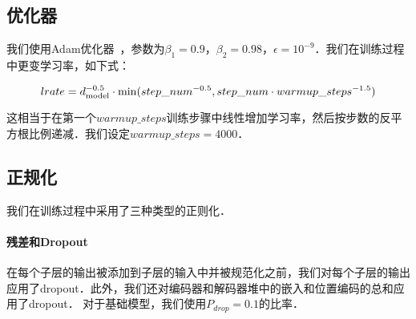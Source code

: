 \subsection{优化器} 


我们使用Adam优化器~\citep{kingma2014adam}，参数为$\beta_1=0.9$，$\beta_2=0.98$，$\epsilon=10^{-9}$．我们在训练过程中更变学习率，如下式：

\begin{equation}
lrate = d_{\text{model}}^{-0.5} \cdot
  \min({step\_num}^{-0.5},
    {step\_num} \cdot {warmup\_steps}^{-1.5})
\end{equation}


这相当于在第一个$warmup\_steps$训练步骤中线性增加学习率，然后按步数的反平方根比例递减．我们设定$warmup\_steps=4000$．

\subsection{正规化} \label{sec:reg}

我们在训练过程中采用了三种类型的正则化．
\paragraph{残差和Dropout} 在每个子层的输出被添加到子层的输入中并被规范化之前，我们对每个子层的输出应用了dropout\citep{srivastava2014dropout}．此外，我们还对编码器和解码器堆中的嵌入和位置编码的总和应用了dropout． 对于基础模型，我们使用$P_{drop}=0.1$的比率．

